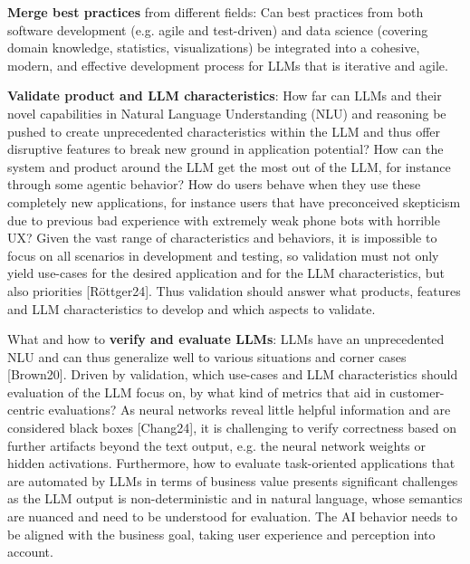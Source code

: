 \documentclass[twocolumn]{article}
\begin{document}
\begin{compactenum}
\item {\bfseries Merge best practices} from different fields: Can best practices from both software development (e.g. agile and test-driven) and data science (covering domain knowledge, statistics, visualizations) be integrated into a cohesive, modern, and effective development process for LLMs that is iterative and agile.
\item {\bfseries Validate product and LLM characteristics}: How far can LLMs and their novel capabilities in Natural Language Understanding (NLU) and reasoning be pushed to create unprecedented characteristics within the LLM and thus offer disruptive features to break new ground in application potential? How can the system and product around the LLM get the most out of the LLM, for instance through some agentic behavior? How do users behave when they use these completely new applications, for instance users that have preconceived skepticism due to previous bad experience with extremely weak phone bots with horrible UX? Given the vast range of characteristics and behaviors, it is impossible to focus on all scenarios in development and testing, so validation must not only yield use-cases for the desired application and for the LLM characteristics, but also priorities [Röttger24]. Thus validation should answer what products, features and LLM characteristics to develop and which aspects to validate.
\item What and how to {\bfseries verify and evaluate LLMs}: LLMs have an unprecedented NLU and can thus generalize well to various situations and corner cases [Brown20]. Driven by validation, which use-cases and LLM characteristics should evaluation of the LLM focus on, by what kind of metrics that aid in customer-centric evaluations? As neural networks reveal little helpful information and are considered black boxes [Chang24], it is challenging to verify correctness based on further artifacts beyond the text output, e.g. the neural network weights or hidden activations. Furthermore, how to evaluate task-oriented applications that are automated by LLMs in terms of business value presents significant challenges as the LLM output is non-deterministic and in natural language, whose semantics are nuanced and need to be understood for evaluation. The AI behavior needs to be aligned with the business goal, taking user experience and perception into account.
\end{compactenum}
\end{document}
